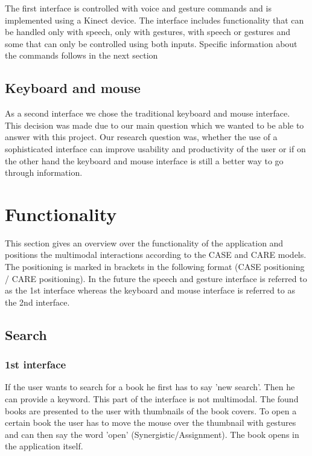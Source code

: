 \documentclass[a4paper, 10pt]{article}
\begin{document}
	\par{The first interface is controlled with voice and gesture commands and is implemented using a Kinect device. The interface includes functionality that can be handled only with speech, only with gestures, with speech or gestures and some that can only be controlled using both inputs. Specific information about the commands follows in the next section}
	
	\subsection{Keyboard and mouse}
	
	\par{As a second interface we chose the traditional keyboard and mouse interface. This decision was made due to our main question which we wanted to be able to answer with this project. Our research question was, whether the use of a sophisticated interface can improve usability and productivity of the user or if on the other hand the keyboard and mouse interface is still a better way to go through information.}
	
	
	\section{Functionality}
	
	\par{This section gives an overview over the functionality of the application and positions the multimodal interactions according to the CASE and CARE models. The positioning is marked in brackets in the following format (CASE positioning / CARE positioning). In the future the speech and gesture interface is referred to as the 1st interface whereas the keyboard and mouse interface is referred to as the 2nd interface.}
	
	\subsection{Search}
	
	\subsubsection{1st interface}
	
	\par{If the user wants to search for a book he first has to say 'new search'. Then he can provide a keyword. This part of the interface is not multimodal. The found books are presented to the user with thumbnails of the book covers. To open a certain book the user has to move the mouse over the thumbnail with gestures and can then say the word 'open'  (Synergistic/Assignment). The book opens in the application itself.}
	
\end{document}

